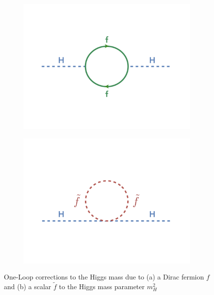 \begin{figure}[h!]
	\begin{center}
	 \begin{subfigure}[b]{0.40\textwidth}
		\includegraphics[width=\textwidth]{figures/theory/loopf.png}
		 \caption{ }
		 \label{fig:SM:Loopf}
    \end{subfigure}
    \begin{subfigure}[b]{0.40\textwidth}
	    	\includegraphics[width=\textwidth]{figures/theory/loopS.png}
                \caption{ }
		\label{fig:SM:Loopftilde}
    \end{subfigure}
    		\caption{One-Loop corrections to the Higgs mass due to (a) a Dirac fermion $f$ and (b) a scalar $\tilde{f}$ to the Higgs mass parameter $m_H^2$}
		\label{fig:SM:Loop}
	\end{center}
\end{figure}

